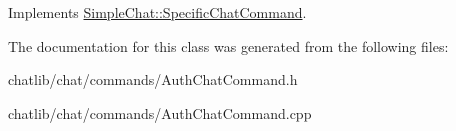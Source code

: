 Implements \hyperlink{classSimpleChat_1_1SpecificChatCommand}{Simple\-Chat\-::\-Specific\-Chat\-Command}.



The documentation for this class was generated from the following files\-:\begin{DoxyCompactItemize}
\item 
chatlib/chat/commands/Auth\-Chat\-Command.\-h\item 
chatlib/chat/commands/Auth\-Chat\-Command.\-cpp\end{DoxyCompactItemize}

